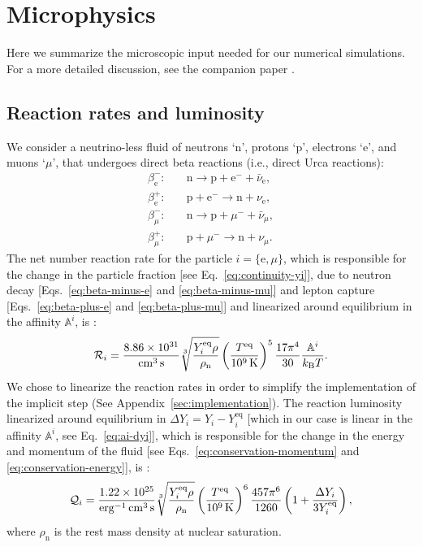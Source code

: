 \documentclass[aps,prd,twocolumn,a4paper,floatfix,nofootbib,superscriptaddress,nofootinbib]{revtex4}
\newcommand{\re}{\mathrm{e}}
\newcommand{\rn}{\mathrm{n}}
\newcommand{\req}{\mathrm{eq}}
\begin{document}
\section{Microphysics}
\label{sec:micro}

Here we summarize the microscopic input needed for our numerical simulations. 
For a more detailed discussion, see the companion paper \citep{Camelio22a}.

\subsection{Reaction rates and luminosity}

We consider a neutrino-less fluid of neutrons `n', protons `p', electrons `e', and muons `$\mu$',
that undergoes direct beta reactions (i.e., direct Urca reactions):
%
\begin{align}
%
\label{eq:beta-minus-e}
\beta^-_\mathrm{e}:  {}&\quad \mathrm n \to \mathrm p + \mathrm e^- + \bar\nu_\mathrm{e},\\
%
\label{eq:beta-plus-e}
\beta^+_\mathrm{e}:  {}&\quad \mathrm p + \mathrm e^- \to \mathrm n + \nu_\mathrm{e},\\
%
\label{eq:beta-minus-mu}
\beta^-_\mu:{}&\quad \mathrm n \to \mathrm p + \mu^- + \bar\nu_\mu,\\
%
\label{eq:beta-plus-mu}
\beta^+_\mu:{}&\quad \mathrm p + \mu^- \to \mathrm n + \nu_\mu.
%
\end{align}
%
The net number reaction rate for the particle $i=\{\re,\mu\}$, which is responsible for the
change in the particle fraction [see Eq.~\eqref{eq:continuity-yi}], due to neutron
decay [Eqs.~\eqref{eq:beta-minus-e} and \eqref{eq:beta-minus-mu}] and lepton
capture [Eqs.~\eqref{eq:beta-plus-e} and \eqref{eq:beta-plus-mu}] and linearized around equilibrium in
the affinity $\mathbb A^i$, is \cite{Camelio22a}:
%
\begin{equation}
\label{eq:R}
\mathcal R_i= \frac{8.86\times 10^{31}}{\unit{cm^{3}\,s}}
\sqrt[3]{\frac{Y^\req_i\rho}{\rho_\rn}} \left(\frac{T^\req}{\unit[10^9]{K}}\right)^5\frac{17\pi^4}{30}\frac{\mathbb A^i}{k_\mathrm{B}T}.
\end{equation}
%
We chose to linearize the reaction rates in
order to simplify the implementation of the implicit step (See Appendix~\ref{sec:implementation}).
The reaction luminosity linearized around equilibrium in $\Delta
Y_i=Y_i-Y_i^\req$ [which in our case is linear in the affinity $\mathbb A^i$,
see Eq.~\eqref{eq:ai-dyi}], which is responsible for the change in the energy
and momentum of the fluid [see Eqs.~\eqref{eq:conservation-momentum} and
\eqref{eq:conservation-energy}], is \cite{Camelio22a}:
%
\begin{equation}
\label{eq:Q}
\mathcal Q_i= \frac{1.22\times10^{25}}{\unit{erg^{-1}\,cm^{3}\,s}}
\sqrt[3]{\frac{Y^\req_i\rho}{\rho_\rn}} \left(\frac{T^\req}{\unit[10^9]{K}}\right)^6\frac{457\pi^6}{1260}
\left(1 + \frac{\Delta Y_i}{3Y^\req_i}\right),
\end{equation}
%
where $\rho_\rn$ is the rest mass density at nuclear saturation.
\end{document}
